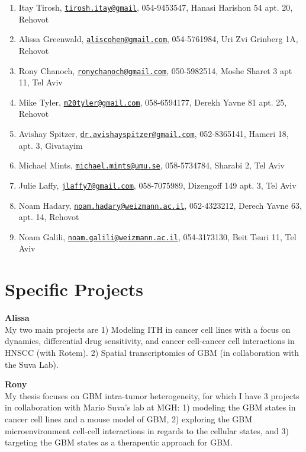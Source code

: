 \documentclass[
]{book}
\providecommand{\tightlist}{%
  \setlength{\itemsep}{0pt}\setlength{\parskip}{0pt}}
\begin{document}
\begin{enumerate}
\def\labelenumi{\arabic{enumi}.}
\tightlist
\item
  Itay Tirosh, \href{mailto:tirosh.itay@gmail}{\nolinkurl{tirosh.itay@gmail}}, 054-9453547, Hanasi Harishon 54 apt. 20, Rehovot
\item
  Alissa Greenwald, \href{mailto:aliscohen@gmail.com}{\nolinkurl{aliscohen@gmail.com}}, 054-5761984, Uri Zvi Grinberg 1A, Rehovot
\item
  Rony Chanoch, \href{mailto:ronychanoch@gmail.com}{\nolinkurl{ronychanoch@gmail.com}}, 050-5982514, Moshe Sharet 3 apt 11, Tel Aviv
\item
  Mike Tyler, \href{mailto:m20tyler@gmail.com}{\nolinkurl{m20tyler@gmail.com}}, 058-6594177, Derekh Yavne 81 apt. 25, Rehovot
\item
  Avishay Spitzer, \href{mailto:dr.avishayspitzer@gmail.com}{\nolinkurl{dr.avishayspitzer@gmail.com}}, 052-8365141, Hameri 18, apt. 3, Givatayim
\item
  Michael Mints, \href{mailto:michael.mints@umu.se}{\nolinkurl{michael.mints@umu.se}}, 058-5734784, Sharabi 2, Tel Aviv
\item
  Julie Laffy, \href{mailto:jlaffy7@gmail.com}{\nolinkurl{jlaffy7@gmail.com}}, 058-7075989, Dizengoff 149 apt. 3, Tel Aviv
\item
  Noam Hadary, \href{mailto:noam.hadary@weizmann.ac.il}{\nolinkurl{noam.hadary@weizmann.ac.il}}, 052-4323212, Derech Yavne 63, apt. 14, Rehovot
\item
  Noam Galili, \href{mailto:noam.galili@weizmann.ac.il}{\nolinkurl{noam.galili@weizmann.ac.il}}, 054-3173130, Beit Tsuri 11, Tel Aviv
\end{enumerate}

\hypertarget{projects}{%
\chapter{Specific Projects}\label{projects}}

\textbf{Alissa}\\
My two main projects are 1) Modeling ITH in cancer cell lines with a focus on dynamics, differential drug sensitivity, and cancer cell-cancer cell interactions in HNSCC (with Rotem). 2) Spatial transcriptomics of GBM (in collaboration with the Suva Lab).

\textbf{Rony}\\
My thesis focuses on GBM intra-tumor heterogeneity, for which I have 3 projects in collaboration with Mario Suva's lab at MGH: 1) modeling the GBM states in cancer cell lines and a mouse model of GBM, 2) exploring the GBM microenvironment cell-cell interactions in regards to the cellular states, and 3) targeting the GBM states as a therapeutic approach for GBM.
\end{document}
